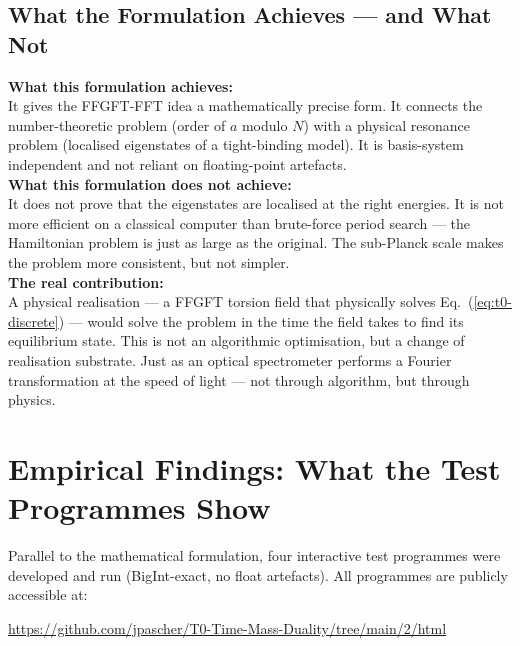 \subsection{What the Formulation Achieves --- and What Not}

\begin{important}
\textbf{What this formulation achieves:}\\
It gives the FFGFT-FFT idea a mathematically precise form.
It connects the number-theoretic problem
(order of $a$ modulo $N$)
with a physical resonance problem
(localised eigenstates of a tight-binding model).
It is basis-system independent and
not reliant on floating-point artefacts.\\[6pt]

\textbf{What this formulation does not achieve:}\\
It does not prove that the eigenstates are localised at the
right energies.
It is not more efficient on a classical computer
than brute-force period search ---
the Hamiltonian problem is just as large
as the original.
The sub-Planck scale makes the problem more consistent,
but not simpler.\\[6pt]

\textbf{The real contribution:}\\
A physical realisation --- a FFGFT torsion field
that physically solves Eq.~(\ref{eq:t0-discrete}) ---
would solve the problem in the time the field
takes to find its equilibrium state.
This is not an algorithmic optimisation,
but a change of realisation substrate.
Just as an optical spectrometer performs a Fourier transformation
at the speed of light ---
not through algorithm, but through physics.
\end{important}

\section{Empirical Findings: What the Test Programmes Show}
\label{sec:empirical}

Parallel to the mathematical formulation, four
interactive test programmes were developed and run
(BigInt-exact, no float artefacts).
All programmes are publicly accessible at:

\begin{center}
\url{https://github.com/jpascher/T0-Time-Mass-Duality/tree/main/2/html}
\end{center}

